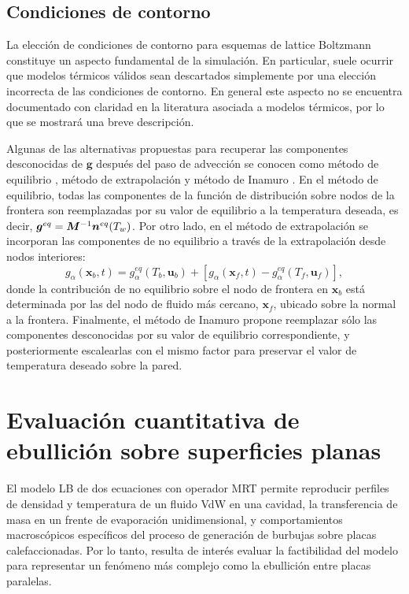 \subsection{Condiciones de contorno}

La elecci\'on de condiciones de contorno para esquemas de lattice Boltzmann constituye un aspecto fundamental de la simulaci\'on. En particular, suele ocurrir que modelos t\'ermicos v\'alidos sean descartados simplemente por una elecci\'on incorrecta de las condiciones de contorno. En general este aspecto no se encuentra documentado con claridad en la literatura asociada a modelos t\'ermicos, por lo que se mostrar\'a una breve descripci\'on.

Algunas de las alternativas propuestas para recuperar las componentes desconocidas de $\bm{g}$ despu\'es del paso de advecci\'on se conocen como m\'etodo de equilibrio \cite{kruger_lattice_2017}, m\'etodo de extrapolaci\'on \cite{guo_extrapolation_2002} y m\'etodo de Inamuro \cite{inamuro_lattice_2002}. En el m\'etodo de equilibrio, todas las componentes de la funci\'on de distribuci\'on sobre nodos de la frontera son reemplazadas por su valor de equilibrio a la temperatura deseada, es decir, $\bm{g}^{eq} = \bm{M}^{-1}\bm{n}^{eq}(T_w)$.  Por otro lado, en el m\'etodo de extrapolaci\'on se incorporan las componentes de no equilibrio a trav\'es de la extrapolaci\'on desde nodos interiores:
\begin{equation}
	g_{\alpha}(\bm{x}_b,t) = g_{\alpha}^{eq}(T_b, \bm{u}_b) + \left[ g_{\alpha}(\bm{x}_f,t) - g_{\alpha}^{eq}(T_f, \bm{u}_f)\right],
\end{equation}
donde la contribuci\'on de no equilibrio sobre el nodo de frontera en $\bm{x}_b$ est\'a determinada por las del nodo de fluido m\'as cercano, $\bm{x}_f$, ubicado sobre la normal a la frontera. Finalmente, el m\'etodo de Inamuro propone reemplazar s\'olo las componentes desconocidas por su valor de equilibrio correspondiente, y posteriormente escalearlas con el mismo factor para preservar el valor de temperatura deseado sobre la pared.







\section{Evaluaci\'on cuantitativa de ebullici\'on sobre superficies planas}

El modelo LB de dos ecuaciones con operador MRT permite reproducir perfiles de densidad y temperatura de un fluido VdW en una cavidad, la transferencia de masa en un frente de evaporaci\'on unidimensional, y comportamientos macrosc\'opicos espec\'ificos del proceso de generaci\'on de burbujas sobre placas calefaccionadas. Por lo tanto, resulta de inter\'es evaluar la factibilidad del modelo para representar un fen\'omeno m\'as complejo como la ebullici\'on entre placas paralelas. 

